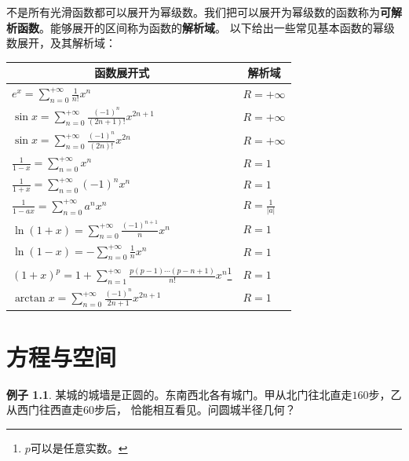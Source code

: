 \documentclass[12pt,UTF8]{ctexbook}
\theoremstyle{definition}
\newtheorem{ex}{例子}[section]
\theoremstyle{plain}
\begin{document}
不是所有光滑函数都可以展开为幂级数。我们把可以展开为幂级数的函数称为\textbf{可解析函数}。能够展开的区间称为函数的\textbf{解析域}。
以下给出一些常见基本函数的幂级数展开，及其解析域：


\begin{center}
    \renewcommand{\arraystretch}{2}
    \setlength{\extrarowheight}{-3pt}
    \begin{longtable}{|l|l|}
        \hline \multicolumn{1}{|c|}{\textbf{函数展开式}} & \multicolumn{1}{c|}{\textbf{解析域}} \\ 
        \hline         
        $e^x = \displaystyle  \sum_{n=0}^{+\infty} \frac{1}{n!} x^n $ & $R=+\infty$ \\  
        \hline
        $\sin{x} = \displaystyle  \sum_{n=0}^{+\infty} \frac{(-1)^n}{(2n+1)!} x^{2n+1} $ & $R=+\infty$ \\ 
        \hline
        $\sin{x} = \displaystyle  \sum_{n=0}^{+\infty} \frac{(-1)^n}{(2n)!} x^{2n} $ & $R=+\infty$ \\
        \hline
        $\displaystyle \frac{1}{1 - x} = \sum_{n=0}^{+\infty} x^n $ & $R = 1$ \\
        \hline
        $\displaystyle \frac{1}{1 + x} = \displaystyle  \sum_{n=0}^{+\infty} (-1)^n x^n $ & $R = 1$ \\
        \hline
        $\displaystyle \frac{1}{1 - ax} = \displaystyle  \sum_{n=0}^{+\infty} a^n x^n $ & $R = \frac{1}{|a|}$ \\
        \hline
        $\ln{(1 + x)} = \displaystyle  \sum_{n=0}^{+\infty} \frac{(-1)^{n+1}}{n} x^n $ & $R = 1$ \\
        \hline
        $\ln{(1 - x)} = \displaystyle  -\sum_{n=0}^{+\infty} \frac{1}{n} x^n $ & $R = 1$ \\
        \hline
        $(1 + x)^p = \displaystyle 1 + \sum_{n=1}^{+\infty} \frac{p(p - 1)\cdots(p - n + 1)}{n!} x^n $\footnote{$p$可以是任意实数。} & $R = 1$ \\
        \hline
        $\arctan{x} = \displaystyle  \sum_{n=0}^{+\infty} \frac{(-1)^n}{2n + 1} x^{2n+1} $ & $R=1$ \\
        \hline
    \end{longtable}
\end{center}

\chapter{方程与空间}

\begin{ex}
    某城的城墙是正圆的。东南西北各有城门。甲从北门往北直走$160$步，乙从西门往西直走$60$步后，
    恰能相互看见。问圆城半径几何？ %
\end{ex}
\end{document}
